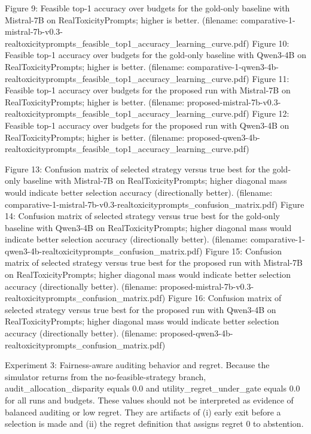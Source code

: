 \documentclass{article} %
\begin{document}
Figure 9: Feasible top-1 accuracy over budgets for the gold-only baseline with Mistral-7B on RealToxicityPrompts; higher is better. (filename: comparative-1-mistral-7b-v0.3-realtoxicityprompts_feasible_top1_accuracy_learning_curve.pdf)
Figure 10: Feasible top-1 accuracy over budgets for the gold-only baseline with Qwen3-4B on RealToxicityPrompts; higher is better. (filename: comparative-1-qwen3-4b-realtoxicityprompts_feasible_top1_accuracy_learning_curve.pdf)
Figure 11: Feasible top-1 accuracy over budgets for the proposed run with Mistral-7B on RealToxicityPrompts; higher is better. (filename: proposed-mistral-7b-v0.3-realtoxicityprompts_feasible_top1_accuracy_learning_curve.pdf)
Figure 12: Feasible top-1 accuracy over budgets for the proposed run with Qwen3-4B on RealToxicityPrompts; higher is better. (filename: proposed-qwen3-4b-realtoxicityprompts_feasible_top1_accuracy_learning_curve.pdf)

Figure 13: Confusion matrix of selected strategy versus true best for the gold-only baseline with Mistral-7B on RealToxicityPrompts; higher diagonal mass would indicate better selection accuracy (directionally better). (filename: comparative-1-mistral-7b-v0.3-realtoxicityprompts_confusion_matrix.pdf)
Figure 14: Confusion matrix of selected strategy versus true best for the gold-only baseline with Qwen3-4B on RealToxicityPrompts; higher diagonal mass would indicate better selection accuracy (directionally better). (filename: comparative-1-qwen3-4b-realtoxicityprompts_confusion_matrix.pdf)
Figure 15: Confusion matrix of selected strategy versus true best for the proposed run with Mistral-7B on RealToxicityPrompts; higher diagonal mass would indicate better selection accuracy (directionally better). (filename: proposed-mistral-7b-v0.3-realtoxicityprompts_confusion_matrix.pdf)
Figure 16: Confusion matrix of selected strategy versus true best for the proposed run with Qwen3-4B on RealToxicityPrompts; higher diagonal mass would indicate better selection accuracy (directionally better). (filename: proposed-qwen3-4b-realtoxicityprompts_confusion_matrix.pdf)

Experiment 3: Fairness-aware auditing behavior and regret. Because the simulator returns from the no-feasible-strategy branch, audit_allocation_disparity equals 0.0 and utility_regret_under_gate equals 0.0 for all runs and budgets. These values should not be interpreted as evidence of balanced auditing or low regret. They are artifacts of (i) early exit before a selection is made and (ii) the regret definition that assigns regret 0 to abstention.
\end{document}
